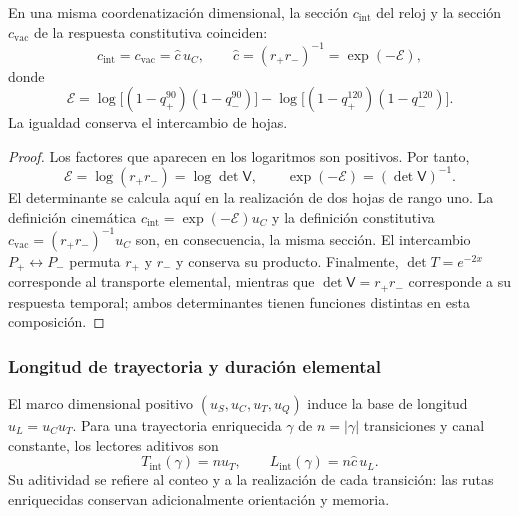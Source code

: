 \begin{proposition}
\label{v:prop:identidad-velocidad}
En una misma coordenatización dimensional, la sección $c_{\mathrm{int}}$ del reloj
y la sección $c_{\mathrm{vac}}$ de la respuesta constitutiva coinciden:
\begin{equation}
 c_{\mathrm{int}}=c_{\mathrm{vac}}
   =\widehat c\,u_C,
 \qquad
 \widehat c=(r_+r_-)^{-1}
            =\exp(-\mathcal E),
 \label{v:eq:identidad-velocidad}
\end{equation}
donde
\begin{equation}
 \mathcal E=
 \log\!\bigl[(1-q_+^{90})(1-q_-^{90})\bigr]
 -\log\!\bigl[(1-q_+^{120})(1-q_-^{120})\bigr].
 \label{v:eq:velocidad-lector-simetrico}
\end{equation}
La igualdad conserva el intercambio de hojas.
\end{proposition}
\begin{proof}
Los factores que aparecen en los logaritmos son positivos. Por tanto,
\[
 \mathcal E=\log(r_+r_-)
            =\log\det\mathsf V,
 \qquad \exp(-\mathcal E)=(\det\mathsf V)^{-1}.
\]
El determinante se calcula aquí en la realización de dos hojas de rango
uno. La definición cinemática $c_{\mathrm{int}}=\exp(-\mathcal E)u_C$
y la definición constitutiva $c_{\mathrm{vac}}=(r_+r_-)^{-1}u_C$
son, en consecuencia, la misma sección. El intercambio $P_+\leftrightarrow
P_-$ permuta $r_+$ y $r_-$ y conserva su producto. Finalmente,
$\det T=e^{-2x}$ corresponde al transporte elemental, mientras que
$\det\mathsf V=r_+r_-$ corresponde a su respuesta temporal; ambos
determinantes tienen funciones distintas en esta composición.
\end{proof}

\subsubsection{Longitud de trayectoria y duración elemental}

El marco dimensional positivo $(u_S,u_C,u_T,u_Q)$ induce la base de
longitud $u_L=u_Cu_T$. Para una trayectoria enriquecida $\gamma$ de
$n=|\gamma|$ transiciones y canal constante, los lectores aditivos son
\begin{equation}
 T_{\mathrm{int}}(\gamma)=n u_T,
 \qquad L_{\mathrm{int}}(\gamma)=n\widehat c\,u_L.
 \label{v:eq:velocidad-longitud-reloj}
\end{equation}
Su aditividad se refiere al conteo y a la realización de cada transición:
las rutas enriquecidas conservan adicionalmente orientación y memoria.

